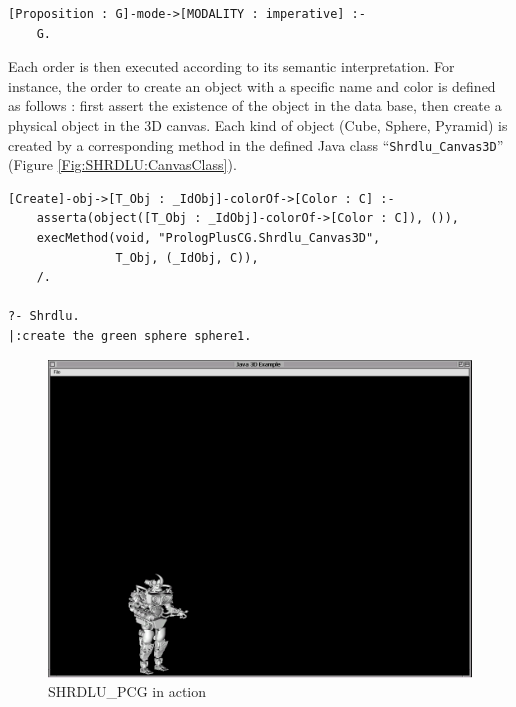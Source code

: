 \documentclass{book}
\begin{document}
\begin{verbatim}
[Proposition : G]-mode->[MODALITY : imperative] :-
    G.
\end{verbatim}



Each order is then executed according to its semantic
interpretation. For instance, the order to create an object with a
specific name and color is defined as follows : first assert the
existence of the object in the data base, then create a physical
object in the 3D canvas. Each kind of object (Cube, Sphere, Pyramid)
is created by a corresponding method in the defined Java class
``\texttt{Shrdlu\_Canvas3D}'' (Figure \ref{Fig:SHRDLU:CanvasClass}).


\begin{verbatim}
[Create]-obj->[T_Obj : _IdObj]-colorOf->[Color : C] :-
    asserta(object([T_Obj : _IdObj]-colorOf->[Color : C]), ()),
    execMethod(void, "PrologPlusCG.Shrdlu_Canvas3D", 
               T_Obj, (_IdObj, C)),
    /.

?- Shrdlu.
|:create the green sphere sphere1.
\end{verbatim}

\begin{latexonly}

\begin{figure}
\begin{center}
\includegraphics[scale=0.3]{Image1.png}
\end{center}
\caption{\label{Fig:SHRDLU:ROBOT}SHRDLU\_PCG in action}
\end{figure}

\end{latexonly}
\end{document}

